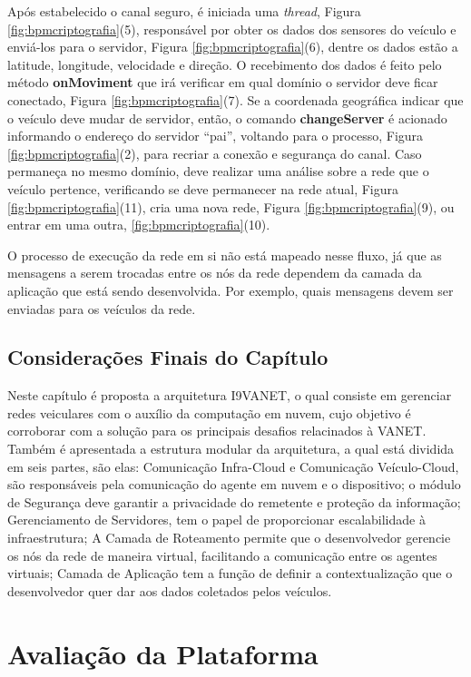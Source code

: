\documentclass[
	12pt,				%
	oneside,			%
	a4paper,			%
	english,			%
	brazil				%
	]{abntex2ppgsi}
\begin{document}
Após estabelecido o canal seguro, é iniciada uma \textit{thread}, Figura \ref{fig:bpmcriptografia}(5), responsável por obter os dados dos sensores do veículo e enviá-los para o servidor, Figura \ref{fig:bpmcriptografia}(6), dentre os dados estão a latitude, longitude, velocidade e direção. O recebimento dos dados é feito pelo método \textbf{onMoviment} que irá verificar em qual domínio o servidor deve ficar conectado, Figura \ref{fig:bpmcriptografia}(7). Se a coordenada geográfica indicar que o veículo deve mudar de servidor, então, o comando \textbf{changeServer} é acionado informando o endereço do servidor ``pai'', voltando para o processo, Figura \ref{fig:bpmcriptografia}(2), para recriar a conexão e segurança do canal. Caso permaneça no mesmo domínio, deve realizar uma análise sobre a rede que o veículo pertence, verificando se deve permanecer na rede atual, Figura  \ref{fig:bpmcriptografia}(11), cria uma  nova rede, Figura \ref{fig:bpmcriptografia}(9), ou entrar em uma outra,  \ref{fig:bpmcriptografia}(10).

O processo de execução da rede em si não está mapeado nesse fluxo, já que as mensagens a serem trocadas entre os nós da rede dependem da camada da aplicação que está sendo desenvolvida. Por exemplo,  quais mensagens devem ser enviadas para os veículos da rede.   

\section{Considerações Finais do Capítulo}
Neste capítulo é proposta a arquitetura I9VANET, o qual consiste em gerenciar redes veiculares com o auxílio da computação em nuvem, cujo objetivo é corroborar com a solução para os principais desafios relacinados à VANET. Também é apresentada a estrutura modular da arquitetura, a qual está dividida em seis partes, são elas: Comunicação Infra-Cloud e Comunicação Veículo-Cloud, são responsáveis pela comunicação do agente em nuvem e o dispositivo; o módulo de Segurança deve garantir a privacidade do remetente e proteção da informação; Gerenciamento de Servidores, tem o papel de proporcionar escalabilidade à infraestrutura; A Camada de Roteamento permite que o desenvolvedor gerencie os nós da rede de maneira virtual, facilitando a comunicação entre os agentes virtuais; Camada de  Aplicação tem a função de definir a contextualização que o desenvolvedor quer dar aos dados coletados pelos veículos. 

\chapter{Avaliação da Plataforma}\label{sec:avaliacaoArquitetura}
\end{document}
